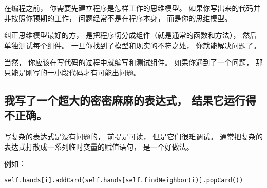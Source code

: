 
在编程之前， 你需要先建立程序是怎样工作的思维模型。  如果你写出来的代码并非按照你预期的工作， 问题经常不是在程序本身， 而是你的思维模型。


纠正思维模型最好的方， 是把程序切分成组件（就是通常的函数和方法）， 然后单独测试每个组件。
一旦你找到了模型和现实的不符之处， 你就能解决问题了。


当然， 你应该在写代码的过程中就编写和测试组件。  如果你遇到了一个问题， 那只能是刚写的一小段代码才有可能出问题。


\subsection{我写了一个超大的密密麻麻的表达式， 结果它运行得不正确。}



写复杂的表达式是没有问题的， 前提是可读， 但是它们很难调试。  通常把复杂的表达式打散成一系列临时变量的赋值语句， 是一个好做法。


例如：

\begin{lstlisting}
self.hands[i].addCard(self.hands[self.findNeighbor(i)].popCard())
\end{lstlisting}

